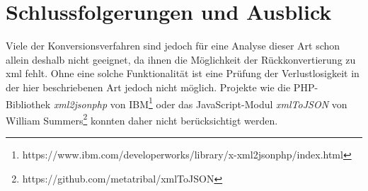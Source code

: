 \chapter{Schlussfolgerungen und Ausblick} \label{chap:conclusion}

Viele der Konversionsverfahren sind jedoch für eine Analyse dieser Art schon allein deshalb nicht geeignet, da ihnen die Möglichkeit der Rückkonvertierung zu \acrshort{xml} fehlt. Ohne eine solche Funktionalität ist eine Prüfung der Verlustlosigkeit in der hier beschriebenen Art jedoch nicht möglich. Projekte wie die PHP-Bibliothek \emph{xml2jsonphp} von IBM\footnote{https://www.ibm.com/developerworks/library/x-xml2jsonphp/index.html} oder das JavaScript-Modul \emph{xmlToJSON} von William Summers\footnote{https://github.com/metatribal/xmlToJSON} konnten daher nicht berücksichtigt werden.

